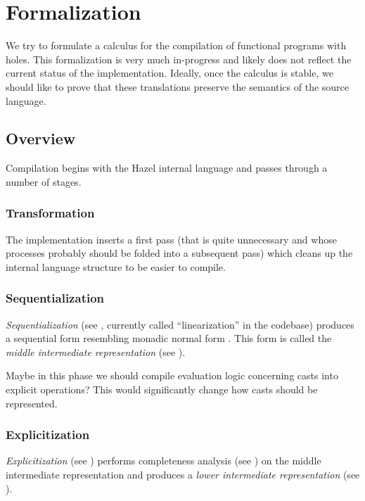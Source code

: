 \documentclass[index.tex]{subfiles}
\begin{document}
\section{Formalization}
\label{formalization}
We try to formulate a calculus for the compilation of functional programs with holes. This
formalization is very much in-progress and likely does not reflect the current status of the
implementation. Ideally, once the calculus is stable, we should like to prove that these
translations preserve the semantics of the source language.

\subsection{Overview}
Compilation begins with the Hazel internal language and passes through a number of stages.

\subsubsection{Transformation}
The implementation inserts a first pass (that is quite unnecessary and whose processes probably
should be folded into a subsequent pass) which cleans up the internal language structure to be
easier to compile.

\subsubsection{Sequentialization}
\emph{Sequentialization} (see , currently called ``linearization'' in
the codebase) produces a sequential form resembling monadic normal form \cite{danvy2003}. This form
is called the \emph{middle intermediate representation} (see ).

\begin{thought}
  Maybe in this phase we should compile evaluation logic concerning casts into explicit operations?
  This would significantly change how casts should be represented.
\end{thought}

\subsubsection{Explicitization}
\emph{Explicitization} (see ) performs completeness analysis (see
) on the middle intermediate representation and produces a
\emph{lower intermediate representation} (see ).



\end{document}
